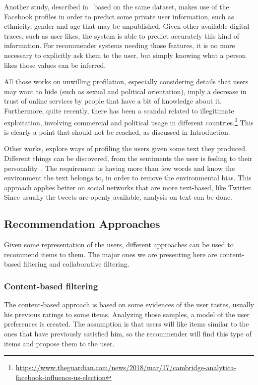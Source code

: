 Another study, described in~\cite{kosinski2013private} based on the same dataset, makes use of the Facebook profiles in order to predict some private user information, such as ethnicity, gender and age that may be unpublished. Given other available digital traces, such as user likes, the system is able to predict accurately this kind of information. For recommender systems needing those features, it is no more necessary to explicitly ask them to the user, but simply knowing what a person likes those values can be inferred.

All those works on unwilling profilation, especially considering details that users may want to hide (such as sexual and political orientation), imply a decrease in trust of online services by people that have a bit of knowledge about it. Furthermore, quite recently, there has been a scandal related to illegitimate exploitation, involving commercial and political usage in different countries.\footnote{\url{https://www.theguardian.com/news/2018/mar/17/cambridge-analytica-facebook-influence-us-election}} This is clearly a point that should not be reached, as discussed in Introduction.

Other works, explore ways of profiling the users given some text they produced. Different things can be discovered, from the sentiments the user is feeling to their personality~\cite{mairesse2007using}. The requirement is having more than few words and know the environment the text belongs to, in order to remove the environmental bias. This approach applies better on social networks that are more text-based, like Twitter. Since usually the tweets are openly available, analysis on text can be done.

\subsection{Recommendation Approaches}
\label{soaPersonalizationRec}

Given some representation of the users, different approaches can be used to recommend items to them. The major ones we are presenting here are content-based filtering and collaborative filtering.

\subsubsection{Content-based filtering}
The content-based approach is based on some evidences of the user tastes, usually his previous ratings to some items. Analyzing those samples, a model of the user preferences is created. The assumption is that users will like items similar to the ones that have previously satisfied him, so the recommender will find this type of items and propose them to the user.


